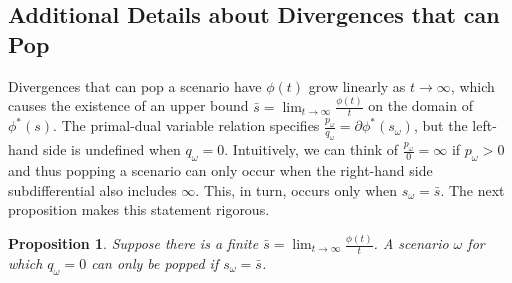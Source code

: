 \documentclass[12pt]{article}
\theoremstyle{plain}
\newtheorem{proposition}[theorem]{Proposition}
\theoremstyle{definition}
\theoremstyle{remark}
\begin{document}
\subsection{Additional Details about Divergences that can Pop}
\label{ssec:pop}

Divergences that can pop a scenario have $\phi(t)$ grow linearly as $t \rightarrow \infty$, which causes the existence of an upper bound $\bar{s} = \lim_{t \rightarrow \infty} \frac{\phi(t)}{t}$ on the domain of $\phi^*(s)$.
The primal-dual variable relation specifies $\frac{p_\omega}{q_\omega} = \partial \phi^*(s_\omega)$, but the left-hand side is undefined when $q_\omega = 0$.
Intuitively, we can think of $\frac{p_\omega}{0} = \infty$ if $p_\omega > 0$ and thus popping a scenario can only occur when the right-hand side subdifferential also includes $\infty$.
This, in turn, occurs only when $s_\omega = \bar{s}$.
The next proposition makes this statement rigorous.

\begin{proposition} \label{prop:pop}
	Suppose there is a finite $\bar{s} = \lim_{t \rightarrow \infty} \frac{\phi(t)}{t}$.
	A scenario $\omega$ for which $q_\omega = 0$ can only be popped if $s_\omega = \bar{s}$.
\end{proposition}
\end{document}
